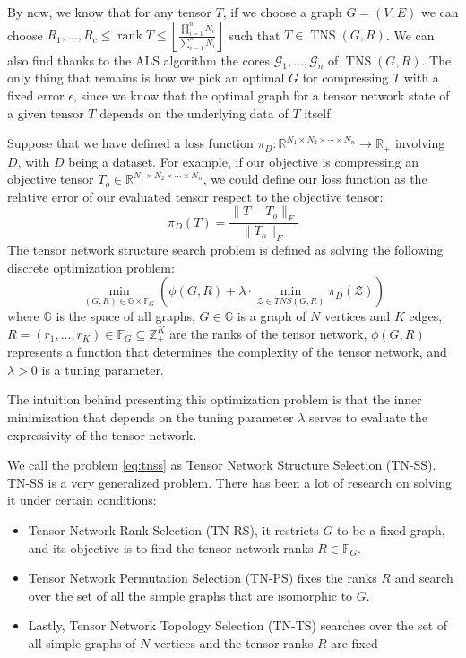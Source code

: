 \documentclass[11pt,a4paper,openright,oneside]{book}
\numberwithin{equation}{section}
\DeclareMathOperator{\rank}{rank}
\DeclareMathOperator{\TNS}{TNS}
\begin{document}
{By now, we know that for any tensor $T$, if we choose a graph $G = (V, E)$ we can choose 
$R_1, \dots, R_c \leqslant \rank{T} \leqslant \left\lfloor \frac{\prod_{i=1}^n N_i}{\sum_{i=1}^n N_i} \right\rfloor$
such that $T \in \TNS(G, R)$. We can also find thanks to the ALS algorithm the cores $\mathcal{G}_1, \dots, \mathcal{G}_n$ of 
$\TNS(G, R)$. The only thing that remains is how we pick an optimal $G$ for compressing $T$ with a fixed error $\epsilon$, since we know that
the optimal graph for a tensor network state of a given tensor $T$ depends on the underlying data of $T$ itself.


Suppose that we have defined a loss function $\pi_D : \mathbb{R}^{N_1 \times N_2 \times \cdots \times N_n} \rightarrow \mathbb{R}_+$
involving $D$, with $D$ being a dataset.
For example, if our objective is compressing an objective tensor $T_o \in \mathbb{R}^{N_1 \times N_2 \times \cdots \times N_n}$,
we could define our loss function as the relative error of our evaluated tensor respect to the objective tensor:
$$\pi_D(T) = \frac{\| T - T_o \|_F}{\| T_o \|_F} $$
The tensor network structure search problem is defined as solving the following discrete optimization problem:
\begin{equation}
\min_{(G, R) \in \mathbb{G} \times \mathbb{F}_G} \left(  \phi(G, R) + \lambda \cdot \min_{\mathcal{Z} \in TNS(G,R)} \pi_D(\mathcal{Z}) \right)
\label{eq:tnss}
\end{equation}
where $\mathbb{G}$ is the space of all graphs, $G \in \mathbb{G}$ is a graph of $N$ vertices and $K$ edges, ${R = (r_1, \dots, r_K) \in \mathbb{F}_G \subseteq
\mathbb{Z}_+^K}$ are the ranks of the tensor network, $\phi(G, R)$ represents a function that determines the complexity of the
tensor network, and $\lambda > 0$ is a tuning parameter.

The intuition behind presenting this optimization problem is that the inner minimization that depends on the tuning parameter $\lambda$
serves to evaluate the expressivity of the tensor network.


We call the problem \ref{eq:tnss} as Tensor Network Structure Selection (TN-SS). TN-SS is a very generalized problem.
There has been a lot of research on solving it under certain conditions:
\begin{itemize}
    \item Tensor Network Rank Selection (TN-RS), it restricts $G$ to be a fixed graph, and its objective is to find the
tensor network ranks $R \in \mathbb{F}_G$.
    \item Tensor Network Permutation Selection (TN-PS) fixes the ranks $R$ and search over the set
of all the simple graphs that are isomorphic to $G$.
    \item Lastly, Tensor Network Topology Selection (TN-TS) searches over the set of all simple graphs of $N$ vertices and
        the tensor ranks $R$ are fixed
\end{itemize}

}
\end{document}
